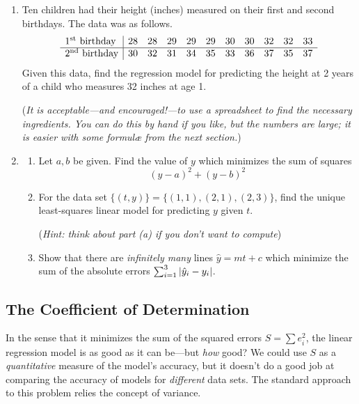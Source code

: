 \begin{exercises}{}{}
\begin{enumerate}
	  
	  \item Ten children had their height (inches) measured on their first and second birthdays. The data was as follows.
	  \[
	  	\begin{array}{l|cccccccccc}
	  		\text{1\textsuperscript{st}{} birthday}&28&28&29&29&29&30&30&32&32&33\\\hline
	  		\text{2\textsuperscript{nd}{} birthday}&30&32&31&34&35&33&36&37&35&37
	  	\end{array}
	  \]
	  Given this data, find the regression model for predicting the height at 2 years of a child who measures 32 inches at age 1. %
	  \par
	  (\emph{It is acceptable---and encouraged!---to use a spreadsheet to find the necessary ingredients. You can do this by hand if you like, but the numbers are large; it is easier with some formulæ from the next section.})
	  
	  \item\begin{enumerate}
	    \item Let $a,b$ be given. Find the value of $y$ which minimizes the sum of squares
	    \[
	    	(y-a)^2+(y-b)^2
	    \]
	    \item For the data set $\bigl\{(t,y)\bigr\} =\bigl\{(1,1),(2,1),(2,3)\bigr\}$, find the unique least-squares linear model for predicting $y$ given $t$.\par
	    (\emph{Hint: think about part (a) if you don't want to compute})
	    \item	Show that there are \emph{infinitely many} lines $\hat y=mt+c$ which minimize the sum of the absolute errors $\sum_{i=1}^3\left| \hat y_i-y_i\right|$.
	  \end{enumerate}
	\end{enumerate}
\end{exercises}




\clearpage



\subsection{The Coefficient of Determination}

In the sense that it minimizes the sum of the squared errors $S=\sum e_i^2$, the linear regression model is as good as it can be---but \emph{how} good? We could use $S$ as a \emph{quantitative} measure of the model's accuracy, but it doesn't do a good job at comparing the accuracy of models for \emph{different} data sets. The standard approach to this problem relies the concept of variance.

